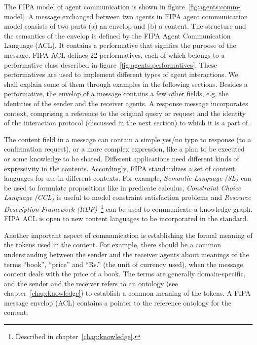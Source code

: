  
The FIPA model of agent communication is shown in figure~\ref{fig:agents:comm-model}. A message exchanged between two agents 
in FIPA agent communication model consists of two parts (a) an envelop and (b) a content. 
%
The structure and the semantics of the envelop is defined by the FIPA Agent Communication Language (ACL). It contains a performative 
that signifies the purpose of the message. FIPA ACL defines 22 performatives, each of which belongs to a performative class described
in figure~\ref{fig:agents:performatives}. These performatives are used to implement different types of agent interactions. We shall 
explain some of them through examples in the following sections.
%
Besides a performative, the envelop of a message contains a few other fields, e.g. the identities of the sender and the receiver 
agents. A response message incorporates context, comprising a reference to the original query or request and the identity of the 
interaction protocol (discussed in the next section) to which it is a part of. 

The content field in a message can contain a simple yes/no type to response (to a confirmation request), or a more complex  
expression, like a plan to be executed or some knowledge to be shared. Different applications need different kinds of 
expressivity in the contents. Accordingly, FIPA standardizes a set of content languages for use in different contexts.
For example, {\em Semantic Language (SL)} can be used to formulate propositions like in predicate calculus, {\em Constraint
Choice Language (CCL)} is useful to model constraint satisfaction problems and {\em Resource Description Framework 
(RDF)}~\footnote{Described in chapter~\ref{chap:knowledge}.} can be used to communicate a knowledge graph. FIPA ACL
is open to new content languages to be incorporated in the standard. 
 
Another important aspect of communication is establishing the formal meaning of the tokens used in the content. For example, there 
should be a common understanding between the sender and the receiver agents about meanings of the terms ``book'', ``price'' and
``Rs.'' (the unit of currency used), when the message content deals with the price of a book. The terms are generally domain-specific, 
and the sender and the receiver refers to an ontology (see chapter~\ref{chap:knowledge}) to establish a common meaning of the 
tokens. A FIPA message envelop (ACL) contains a pointer to the reference ontology for the content.

